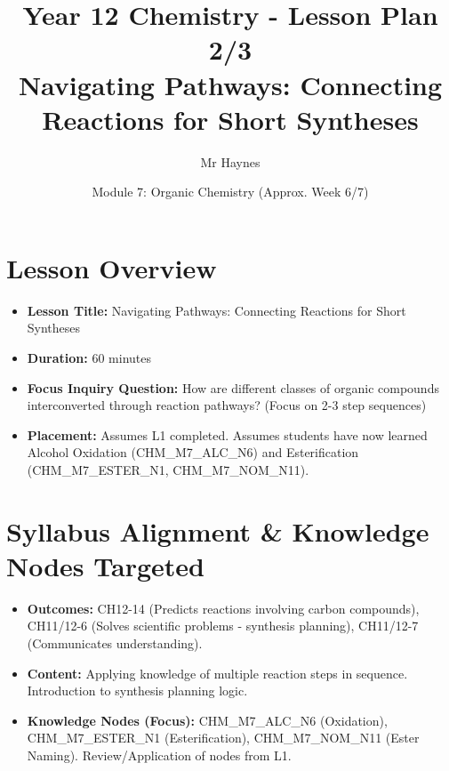 \documentclass[11pt, a4paper]{article}
\title{Year 12 Chemistry - Lesson Plan 2/3 \\ Navigating Pathways: Connecting Reactions for Short Syntheses}
\date{Module 7: Organic Chemistry (Approx. Week 6/7)}
\author{Mr Haynes} %
\begin{document}
\maketitle
\vspace{-2em} %

\section*{Lesson Overview}
\begin{itemize}
    \item \textbf{Lesson Title:} Navigating Pathways: Connecting Reactions for Short Syntheses
    \item \textbf{Duration:} 60 minutes
    \item \textbf{Focus Inquiry Question:} How are different classes of organic compounds interconverted through reaction pathways? (Focus on 2-3 step sequences)
    \item \textbf{Placement:} Assumes L1 completed. Assumes students have now learned Alcohol Oxidation (CHM\_M7\_ALC\_N6) and Esterification (CHM\_M7\_ESTER\_N1, CHM\_M7\_NOM\_N11).
\end{itemize}

\section*{Syllabus Alignment \& Knowledge Nodes Targeted}
\begin{itemize}
    \item \textbf{Outcomes:} CH12-14 (Predicts reactions involving carbon compounds), CH11/12-6 (Solves scientific problems - synthesis planning), CH11/12-7 (Communicates understanding).
    \item \textbf{Content:} Applying knowledge of multiple reaction steps in sequence. Introduction to synthesis planning logic.
    \item \textbf{Knowledge Nodes (Focus):} CHM\_M7\_ALC\_N6 (Oxidation), CHM\_M7\_ESTER\_N1 (Esterification), CHM\_M7\_NOM\_N11 (Ester Naming). Review/Application of nodes from L1.
\end{itemize}
\end{document}
